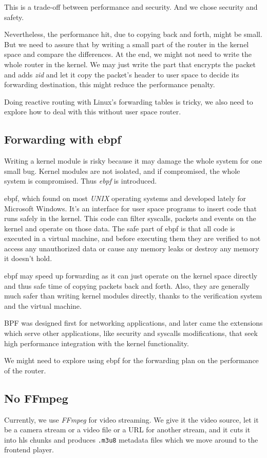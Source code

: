 This is a trade-off between performance and security.
And we chose security and safety.

Nevertheless, the performance hit, due to copying back and forth, might be small.
But we need to assure that by writing a small part of the router in the kernel space and compare the differences.
At the end, we might not need to write the whole router in the kernel.
We may just write the part that encrypts the packet and adds \textit{\acrshort{zid}} and let it copy the packet's header to user space to decide its forwarding destination, this might reduce the performance penalty.

Doing reactive routing with Linux's forwarding tables is tricky, we also need to explore how to deal with this without user space router.

\subsection{Forwarding with \acrshort{ebpf}}
Writing a kernel module is risky because it may damage the whole system for one small bug.
Kernel modules are not isolated, and if compromised, the whole system is compromised.
Thus \textit{\acrshort{ebpf}} is introduced.

\acrfull{ebpf}, which found on most \textit{UNIX} operating systems and developed lately for Microsoft Windows.
It's an interface for user space programs to insert code that runs safely in the kernel.
This code can filter syscalls, packets and events on the kernel and operate on those data.
The safe part of \acrshort{ebpf} is that all code is executed in a virtual machine, and before executing them they are verified to not access any unauthorized data or cause any memory leaks or destroy any memory it doesn't hold.

\acrshort{ebpf} may speed up forwarding as it can just operate on the kernel space directly and thus safe time of copying packets back and forth.
Also, they are generally much safer than writing kernel modules directly, thanks to the verification system and the virtual machine.

BPF was designed first for networking applications, and later came the extensions which serve other applications, like security and syscalls modifications, that seek high performance integration with the kernel functionality.

We might need to explore using \acrshort{ebpf} for the forwarding plan on the performance of the router.

\subsection{No FFmpeg}
Currently, we use \textit{FFmpeg} for video streaming.
We give it the video source, let it be a camera stream or a video file or a URL for another stream, and it cuts it into \acrshort{hls} chunks and produces \texttt{.m3u8} metadata files which we move around to the frontend player.

